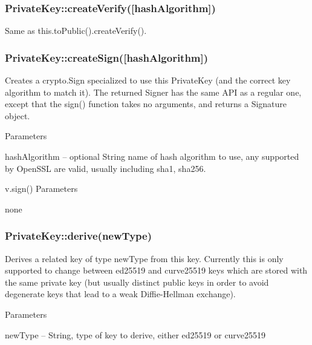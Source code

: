 \subsubsection*{{\ttfamily Private\+Key\+::create\+Verify(\mbox{[}hash\+Algorithm\mbox{]})}}

Same as {\ttfamily this.\+to\+Public().create\+Verify()}.

\subsubsection*{{\ttfamily Private\+Key\+::create\+Sign(\mbox{[}hash\+Algorithm\mbox{]})}}

Creates a {\ttfamily crypto.\+Sign} specialized to use this Private\+Key (and the correct key algorithm to match it). The returned Signer has the same A\+PI as a regular one, except that the {\ttfamily sign()} function takes no arguments, and returns a {\ttfamily Signature} object.

Parameters


\begin{DoxyItemize}
\item {\ttfamily hash\+Algorithm} -- optional String name of hash algorithm to use, any supported by Open\+S\+SL are valid, usually including {\ttfamily sha1}, {\ttfamily sha256}.
\end{DoxyItemize}

{\ttfamily v.\+sign()} Parameters


\begin{DoxyItemize}
\item none
\end{DoxyItemize}

\subsubsection*{{\ttfamily Private\+Key\+::derive(new\+Type)}}

Derives a related key of type {\ttfamily new\+Type} from this key. Currently this is only supported to change between {\ttfamily ed25519} and {\ttfamily curve25519} keys which are stored with the same private key (but usually distinct public keys in order to avoid degenerate keys that lead to a weak Diffie-\/\+Hellman exchange).

Parameters


\begin{DoxyItemize}
\item {\ttfamily new\+Type} -- String, type of key to derive, either {\ttfamily ed25519} or {\ttfamily curve25519}
\end{DoxyItemize}

